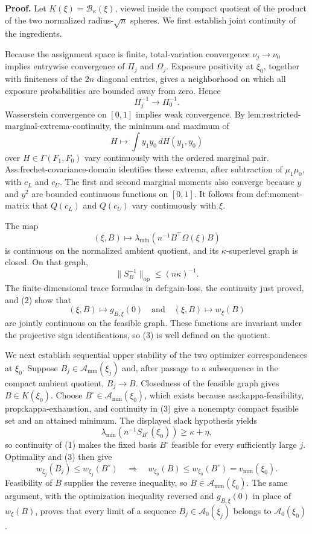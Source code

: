 \textbf{Proof.}
Let \(K(\xi)=\mathcal B_\kappa(\xi)\), viewed inside the compact quotient of the product of the two normalized radius-\(\sqrt n\) spheres.  We first establish joint continuity of the ingredients.

Because the assignment space is finite, total-variation convergence \(\nu_j\to\nu_0\) implies entrywise convergence of \(\Pi_j\) and \(\Omega_j\).  Exposure positivity at \(\xi_0\), together with finiteness of the \(2n\) diagonal entries, gives a neighborhood on which all exposure probabilities are bounded away from zero.  Hence
\[
\Pi_j^{-1}\longrightarrow\Pi_0^{-1}.
\]
Wasserstein convergence on \([0,1]\) implies weak convergence.  By lem:restricted-marginal-extrema-continuity, the minimum and maximum of
\[
H\longmapsto\int y_1y_0\,dH(y_1,y_0)
\]
over \(H\in\Gamma(F_1,F_0)\) vary continuously with the ordered marginal pair.  Ass:frechet-covariance-domain identifies these extrema, after subtraction of \(\mu_1\mu_0\), with \(c_L\) and \(c_U\).  The first and second marginal moments also converge because \(y\) and \(y^2\) are bounded continuous functions on \([0,1]\).  It follows from def:moment-matrix that \(Q(c_L)\) and \(Q(c_U)\) vary continuously with \(\xi\).

The map
\[
(\xi,B)\longmapsto
\lambda_{\min}\!\left(n^{-1}B^{\top}\Omega(\xi)B\right)
\tag{1}
\]
is continuous on the normalized ambient quotient, and its \(\kappa\)-superlevel graph is closed.  On that graph,
\[
\lVert S_B^{-1}\rVert_{\mathrm{op}}\le(n\kappa)^{-1}.
\tag{2}
\]
The finite-dimensional trace formulas in def:gain-loss, the continuity just proved, and (2) show that
\[
(\xi,B)\longmapsto g_{B,\xi}(0)
\quad\text{and}\quad
(\xi,B)\longmapsto w_\xi(B)
\tag{3}
\]
are jointly continuous on the feasible graph.  These functions are invariant under the projective sign identifications, so (3) is well defined on the quotient.

We next establish sequential upper stability of the two optimizer correspondences at \(\xi_0\).  Suppose \(B_j\in\mathcal A_{\mathrm{mm}}(\xi_j)\) and, after passage to a subsequence in the compact ambient quotient, \(B_j\to B\).  Closedness of the feasible graph gives \(B\in K(\xi_0)\).  Choose \(B^\circ\in\mathcal A_{\mathrm{mm}}(\xi_0)\), which exists because ass:kappa-feasibility, prop:kappa-exhaustion, and continuity in (3) give a nonempty compact feasible set and an attained minimum.  The displayed slack hypothesis yields
\[
\lambda_{\min}\!\left(n^{-1}S_{B^\circ}(\xi_0)\right)\ge\kappa+\eta,
\]
so continuity of (1) makes the fixed basis \(B^\circ\) feasible for every sufficiently large \(j\).  Optimality and (3) then give
\[
w_{\xi_j}(B_j)\le w_{\xi_j}(B^\circ)
\quad\Longrightarrow\quad
w_{\xi_0}(B)\le w_{\xi_0}(B^\circ)=v_{\mathrm{mm}}(\xi_0).
\]
Feasibility of \(B\) supplies the reverse inequality, so \(B\in\mathcal A_{\mathrm{mm}}(\xi_0)\).  The same argument, with the optimization inequality reversed and \(g_{B,\xi}(0)\) in place of \(w_\xi(B)\), proves that every limit of a sequence \(B_j\in\mathcal A_0(\xi_j)\) belongs to \(\mathcal A_0(\xi_0)\).

